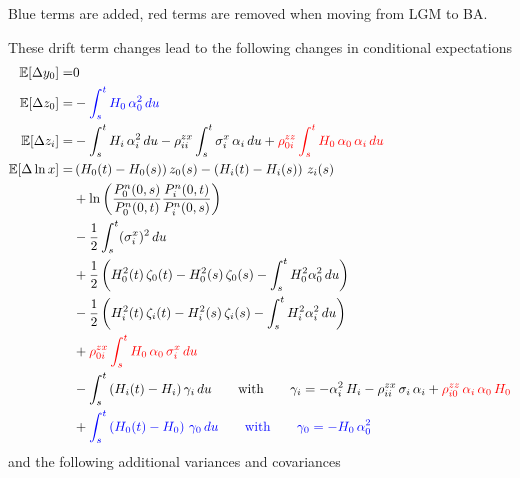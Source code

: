 Blue terms are {\color{blue}added}, red terms are {\color{red}removed} when moving from LGM to BA.

\medskip\noindent

These drift term changes lead to the following changes in conditional expectations 
\begin{align*}
\operatorname{\mathbb{E}}[\Delta y_0] =& 0 \\
\operatorname{\mathbb{E}}[\Delta z_0] =& - {\color{blue}\int_s^t H_0\,\alpha_0^2\,du}  \\
\operatorname{\mathbb{E}}[\Delta z_i] =& - \int_s^t H_i\,\alpha_i^2\,du 
  - \rho^{zx}_{ii}\int_s^t \sigma_i^x\,\alpha_i\,du
  + {\color{red}\rho^{zz}_{0i} \int_s^t H_0\,\alpha_0\,\alpha_i\,du } \\
\operatorname{\mathbb{E}}[\Delta \ln x] 
  =& \left(H_0(t)-H_0(s)\right) z_0(s) -\left(H_i(t)-H_i(s)\right)\,z_i(s)\\
  &+ \ln \left( \frac{P^n_0(0,s)}{P^n_0(0,t)} \frac{P^n_i(0,t)}{P^n_i(0,s)}\right) \\
  & - \frac12 \int_s^t (\sigma^x_i)^2\,du \\
  &+\frac12 \left(H^2_0(t)\, \zeta_0(t) -  H^2_0(s) \,\zeta_0(s) - \int_s^t H_0^2 \alpha_0^2\,du\right)\\
  &-\frac12 \left(H^2_i(t) \,\zeta_i(t) -  H^2_i(s) \,\zeta_i(s) - \int_s^t H_i^2 \alpha_i^2\,du\right)\\
  & + {\color{red} \rho^{zx}_{0i} \int_s^t H_0\, \alpha_0\, \sigma^x_i\,du} \\
  &  - \int_s^t \left(H_i(t)-H_i\right)\gamma_i \,du \qquad\mbox{with}\qquad
  \gamma_i = -\alpha_i^2\,H_i -\rho_{ii}^{zx}\,\sigma_i\,\alpha_i + {\color{red}\rho_{i0}^{zz}\,\alpha_i\,\alpha_0\,H_0}   \\
  & + {\color{blue}\int_s^t \left(H_0(t)-H_0\right)\,\gamma_0 \,du \qquad \mbox{with}\qquad \gamma_0 = - H_0\,\alpha_0^2}
\end{align*}
and the following additional variances and covariances
